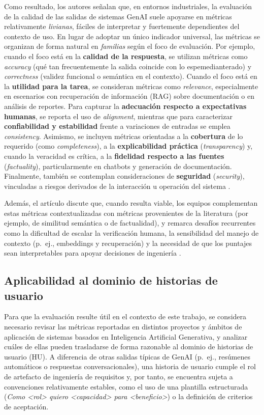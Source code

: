 Como resultado, los autores señalan que, en entornos industriales, la evaluación de la calidad de las salidas de sistemas GenAI suele apoyarse en métricas relativamente \textit{livianas}, fáciles de interpretar y fuertemente dependientes del contexto de uso. En lugar de adoptar un único indicador universal, las métricas se organizan de forma natural en \textit{familias} según el foco de evaluación. Por ejemplo, cuando el foco está en la \textbf{calidad de la respuesta}, se utilizan métricas como \textit{accuracy} (qué tan frecuentemente la salida coincide con lo espemedianterado) y \textit{correctness} (validez funcional o semántica en el contexto). Cuando el foco está en la \textbf{utilidad para la tarea}, se consideran métricas como \textit{relevance}, especialmente en escenarios con recuperación de información (RAG) sobre documentación o en análisis de reportes. Para capturar la \textbf{adecuación respecto a expectativas humanas}, se reporta el uso de \textit{alignment}, mientras que para caracterizar \textbf{confiabilidad y estabilidad} frente a variaciones de entradas se emplea \textit{consistency}. Asimismo, se incluyen métricas orientadas a la \textbf{cobertura} de lo requerido (como \textit{completeness}), a la \textbf{explicabilidad práctica} (\textit{transparency}) y, cuando la veracidad es crítica, a la \textbf{fidelidad respecto a las fuentes} (\textit{factuality}), particularmente en chatbots y generación de documentación. Finalmente, también se contemplan consideraciones de \textbf{seguridad} (\textit{security}), vinculadas a riesgos derivados de la interacción u operación del sistema \cite{yu2026evaluating_genai_quality_multicase}.

Además, el artículo discute que, cuando resulta viable, los equipos complementan estas métricas contextualizadas con métricas provenientes de la literatura (por ejemplo, de similitud semántica o de factualidad), y remarca desafíos recurrentes como la dificultad de escalar la verificación humana, la sensibilidad del manejo de contexto (p.\ ej., embeddings y recuperación) y la necesidad de que los puntajes sean interpretables para apoyar decisiones de ingeniería \cite{yu2026evaluating_genai_quality_multicase}.

\subsection{Aplicabilidad al dominio de historias de usuario}
Para que la evaluación resulte útil en el contexto de este trabajo, se considera
necesario revisar las métricas reportadas en distintos proyectos y ámbitos de
aplicación de sistemas basados en Inteligencia Artificial Generativa, y analizar
cuáles de ellas pueden trasladarse de forma razonable al dominio de historias de
usuario (HU). A diferencia de otras salidas típicas de GenAI (p.\ ej., resúmenes
automáticos o respuestas conversacionales), una historia de usuario cumple el
rol de artefacto de ingeniería de requisitos y, por tanto, se encuentra sujeta a
convenciones relativamente estables, como el uso de una plantilla estructurada
(\textit{Como <rol> quiero <capacidad> para <beneficio>}) o la definición de
criterios de aceptación.

